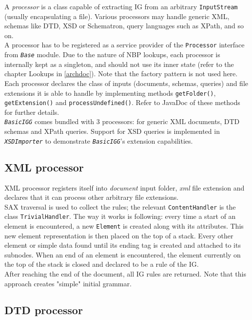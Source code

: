 \documentclass[a4paper,10pt,oneside]{article}
\newcommand{\code}[1]{\texttt{#1}}
\newcommand{\jmodule}[1]{\texttt{\textit{#1}}}
\begin{document}
A \emph{processor} is a class capable of extracting IG from an arbitrary \code{InputStream} (usually encapsulating a file). Various processors may handle generic XML, schemas like DTD, XSD or Schematron, query languages such as XPath, and so on.\\
A processor has to be registered as a service provider of the \code{Processor} interface from \jmodule{Base} module. Due to the nature of NBP lookups, each processor is internally kept as a singleton, and should not use its inner state (refer to the chapter Lookups in \ref{archdoc}). Note that the factory pattern is not used here.\\ %
Each processor declares the class of inputs (documents, schemas, queries) and file extensions it is able to handle by implementing methods \code{getFolder()}, \code{getExtension()} and \code{processUndefined()}. Refer to JavaDoc of these methods for further details.\\

\jmodule{BasicIGG} comes bundled with 3 processors: for generic XML documents, DTD schemas and XPath queries. Support for XSD queries is implemented in \jmodule{XSDImporter} to demonstrate \jmodule{BasicIGG}'s extension capabilities.

\subsection{XML processor}

XML processor registers itself into \emph{document} input folder, \emph{xml} file extension and declares that it can process other arbitrary file extensions.\\
SAX traversal is used to collect the rules; the relevant \code{ContentHandler} is the class \code{TrivialHandler}. The way it works is following: every time a start of an element is encountered, a new \code{Element} is created along with its attributes. This new element representation is then placed on the top of a stack. Every other element or simple data found until its ending tag is created and attached to its subnodes. When an end of an element is encountered, the element currently on the top of the stack is closed and declared to be a rule of the IG.\\
After reaching the end of the document, all IG rules are returned. Note that this approach creates "simple" initial grammar.

\subsection{DTD processor}
\end{document}

